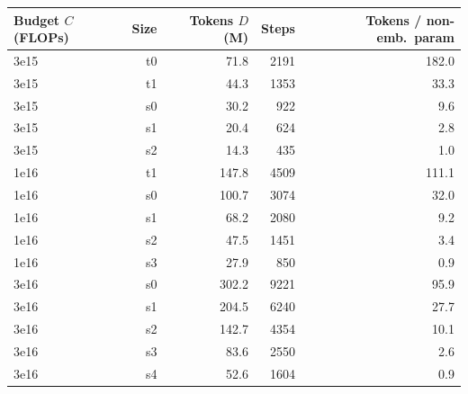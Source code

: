 \begin{tabular}{lrrrr}
\toprule
Budget $C$ (FLOPs) & Size & Tokens $D$ (M) & Steps & Tokens / non-emb.\ param \\
\midrule
3e15 & t0 & 71.8 & 2191 & 182.0 \\
3e15 & t1 & 44.3 & 1353 & 33.3 \\
3e15 & s0 & 30.2 & 922 & 9.6 \\
3e15 & s1 & 20.4 & 624 & 2.8 \\
3e15 & s2 & 14.3 & 435 & 1.0 \\
1e16 & t1 & 147.8 & 4509 & 111.1 \\
1e16 & s0 & 100.7 & 3074 & 32.0 \\
1e16 & s1 & 68.2 & 2080 & 9.2 \\
1e16 & s2 & 47.5 & 1451 & 3.4 \\
1e16 & s3 & 27.9 & 850 & 0.9 \\
3e16 & s0 & 302.2 & 9221 & 95.9 \\
3e16 & s1 & 204.5 & 6240 & 27.7 \\
3e16 & s2 & 142.7 & 4354 & 10.1 \\
3e16 & s3 & 83.6 & 2550 & 2.6 \\
3e16 & s4 & 52.6 & 1604 & 0.9 \\
\bottomrule
\end{tabular}
